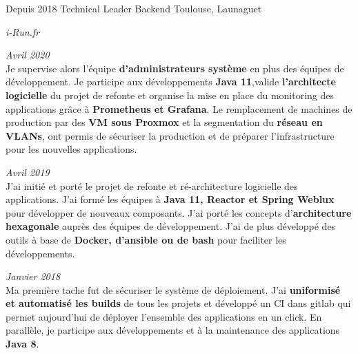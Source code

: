 \documentclass{friggeri-cv} 	%
\begin{document}
\begin{entrylist}
\entry
{Depuis 2018}
{Technical Leader Backend}
{Toulouse, Launaguet}
{\vspace{-0.4cm}\emph{i-Run.fr} \\
\begin{description}[leftmargin=0cm]
    \item [\hspace*{-1cm}\bodyfont{|} \normalfont \textbf{\color{orange}CTO \color{headercolor}Adjoint}] \hfill \textit{Avril 2020}\\
    Je supervise alors l’équipe \textbf{d’administrateurs système} en plus des équipes de développement. Je participe aux développements \textbf{Java 11},valide \textbf{l’architecte logicielle} du projet de refonte et organise la mise en place du monitoring des applications grâce à \textbf{Prometheus et Grafana}. Le remplacement de machines de production par des \textbf{VM sous Proxmox} et la segmentation du \textbf{réseau en VLANs}, ont permis de sécuriser la production et de préparer l’infrastructure pour les nouvelles applications. 

    \item [\hspace*{-1cm}\bodyfont{|} \normalfont \textbf{\color{orange}Responsable \color{headercolor}Technique}] \hfill \textit{Avril 2019}\\
    J’ai initié et porté le projet de refonte et ré-architecture logicielle des applications. J’ai formé les équipes à \textbf{Java 11, Reactor et Spring Weblux} pour développer de nouveaux composants. J’ai porté les concepts d’\textbf{architecture hexagonale} auprès des équipes de développement. J’ai de plus développé des outils à base de \textbf{Docker, d’ansible ou de bash} pour faciliter les développements.

    \item[\hspace*{-1cm}\bodyfont{|} \normalfont \textbf{\color{orange}Tech \color{headercolor}Lead Backend}] \hfill \textit{Janvier 2018}\\
    Ma première tache fut de sécuriser le système de déploiement. J’ai \textbf{uniformisé et automatisé les builds} de tous les projets et développé un CI dans gitlab qui permet aujourd’hui de déployer l'ensemble des applications en un click. En parallèle, je participe aux développements et à la maintenance des applications \textbf{Java 8}. 
\end{description}
\
}


\end{entrylist}
\end{document}
